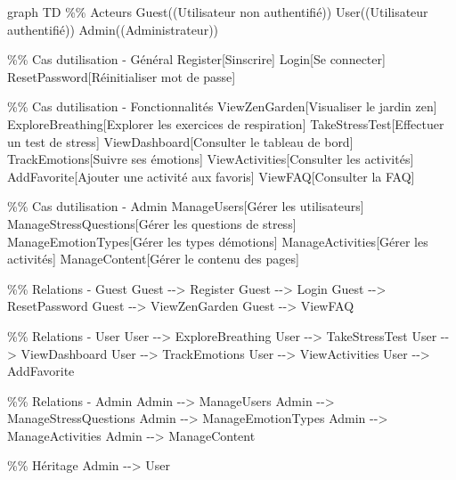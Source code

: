 \documentclass[
]{article}
\newenvironment{Shaded}{}{}
\newcommand{\NormalTok}[1]{#1}
\begin{document}
\begin{Shaded}
\begin{Highlighting}[]
\NormalTok{graph TD}
\NormalTok{    \%\% Acteurs}
\NormalTok{    Guest((Utilisateur non authentifié))}
\NormalTok{    User((Utilisateur authentifié))}
\NormalTok{    Admin((Administrateur))}
    
\NormalTok{    \%\% Cas d\textquotesingle{}utilisation {-} Général}
\NormalTok{    Register[S\textquotesingle{}inscrire]}
\NormalTok{    Login[Se connecter]}
\NormalTok{    ResetPassword[Réinitialiser mot de passe]}
    
\NormalTok{    \%\% Cas d\textquotesingle{}utilisation {-} Fonctionnalités}
\NormalTok{    ViewZenGarden[Visualiser le jardin zen]}
\NormalTok{    ExploreBreathing[Explorer les exercices de respiration]}
\NormalTok{    TakeStressTest[Effectuer un test de stress]}
\NormalTok{    ViewDashboard[Consulter le tableau de bord]}
\NormalTok{    TrackEmotions[Suivre ses émotions]}
\NormalTok{    ViewActivities[Consulter les activités]}
\NormalTok{    AddFavorite[Ajouter une activité aux favoris]}
\NormalTok{    ViewFAQ[Consulter la FAQ]}
    
\NormalTok{    \%\% Cas d\textquotesingle{}utilisation {-} Admin}
\NormalTok{    ManageUsers[Gérer les utilisateurs]}
\NormalTok{    ManageStressQuestions[Gérer les questions de stress]}
\NormalTok{    ManageEmotionTypes[Gérer les types d\textquotesingle{}émotions]}
\NormalTok{    ManageActivities[Gérer les activités]}
\NormalTok{    ManageContent[Gérer le contenu des pages]}
    
\NormalTok{    \%\% Relations {-} Guest}
\NormalTok{    Guest {-}{-}\textgreater{} Register}
\NormalTok{    Guest {-}{-}\textgreater{} Login}
\NormalTok{    Guest {-}{-}\textgreater{} ResetPassword}
\NormalTok{    Guest {-}{-}\textgreater{} ViewZenGarden}
\NormalTok{    Guest {-}{-}\textgreater{} ViewFAQ}
    
\NormalTok{    \%\% Relations {-} User}
\NormalTok{    User {-}{-}\textgreater{} ExploreBreathing}
\NormalTok{    User {-}{-}\textgreater{} TakeStressTest}
\NormalTok{    User {-}{-}\textgreater{} ViewDashboard}
\NormalTok{    User {-}{-}\textgreater{} TrackEmotions}
\NormalTok{    User {-}{-}\textgreater{} ViewActivities}
\NormalTok{    User {-}{-}\textgreater{} AddFavorite}
    
\NormalTok{    \%\% Relations {-} Admin}
\NormalTok{    Admin {-}{-}\textgreater{} ManageUsers}
\NormalTok{    Admin {-}{-}\textgreater{} ManageStressQuestions}
\NormalTok{    Admin {-}{-}\textgreater{} ManageEmotionTypes}
\NormalTok{    Admin {-}{-}\textgreater{} ManageActivities}
\NormalTok{    Admin {-}{-}\textgreater{} ManageContent}
    
\NormalTok{    \%\% Héritage}
\NormalTok{    Admin {-}{-}\textgreater{} User}
\end{Highlighting}
\end{Shaded}
\end{document}
